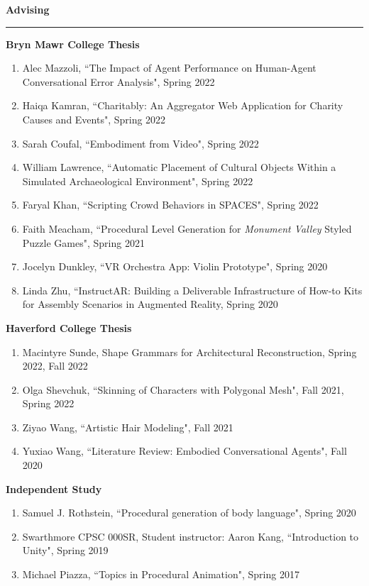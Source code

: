 \pagebreak

\needspace{6em}
{\large {\bf Advising}}
\vspace{0.1cm}
\hrule
\medskip
\medskip

{\bf Bryn Mawr College Thesis }
\vspace{-1.0em}

\begin{enumerate}[leftmargin=*,label={}]
\item Alec Mazzoli, ``The Impact of Agent Performance on Human-Agent Conversational Error Analysis", Spring 2022
\item Haiqa Kamran, ``Charitably: An Aggregator Web Application for Charity Causes and Events", Spring 2022
\item Sarah Coufal, ``Embodiment from Video", Spring 2022
\item William Lawrence, ``Automatic Placement of Cultural Objects Within a Simulated Archaeological Environment", Spring 2022
\item Faryal Khan, ``Scripting Crowd Behaviors in SPACES", Spring 2022 
\item Faith Meacham, ``Procedural Level Generation for \textit{Monument Valley} Styled Puzzle Games", Spring 2021
\item Jocelyn Dunkley, ``VR Orchestra App: Violin Prototype", Spring 2020
\item Linda Zhu, ``InstructAR: Building a Deliverable Infrastructure of How-to Kits for Assembly Scenarios in Augmented Reality, Spring 2020
\end{enumerate}

{\bf Haverford College Thesis}
\vspace{-1.0em}

\begin{enumerate}[leftmargin=*,label={}]
\item Macintyre Sunde, Shape Grammars for Architectural Reconstruction, Spring 2022, Fall 2022
\item Olga Shevchuk, ``Skinning of Characters with Polygonal Mesh", Fall 2021, Spring 2022
\item Ziyao Wang, ``Artistic Hair Modeling", Fall 2021
\item Yuxiao Wang, ``Literature Review: Embodied Conversational Agents", Fall 2020
\end{enumerate}

{\bf Independent Study}
\vspace{-1.0em}

\begin{enumerate}[leftmargin=*,label={}]
\item Samuel J. Rothstein, ``Procedural generation of body language", Spring 2020
\item Swarthmore CPSC 000SR, Student instructor: Aaron Kang, ``Introduction to Unity", Spring 2019
\item Michael Piazza, ``Topics in Procedural Animation", Spring 2017
\end{enumerate}

